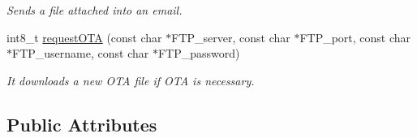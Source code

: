 \begin{DoxyCompactItemize}
\begin{DoxyCompactList}\small\item\em Sends a file attached into an email. \end{DoxyCompactList}\item 
int8\+\_\+t \hyperlink{class_wasp3_g_a117796aabab7be47f12f3ada119353e1}{request\+O\+TA} (const char $\ast$F\+T\+P\+\_\+server, const char $\ast$F\+T\+P\+\_\+port, const char $\ast$F\+T\+P\+\_\+username, const char $\ast$F\+T\+P\+\_\+password)
\begin{DoxyCompactList}\small\item\em It downloads a new O\+TA file if O\+TA is necessary. \end{DoxyCompactList}\end{DoxyCompactItemize}
\subsection*{Public Attributes}
